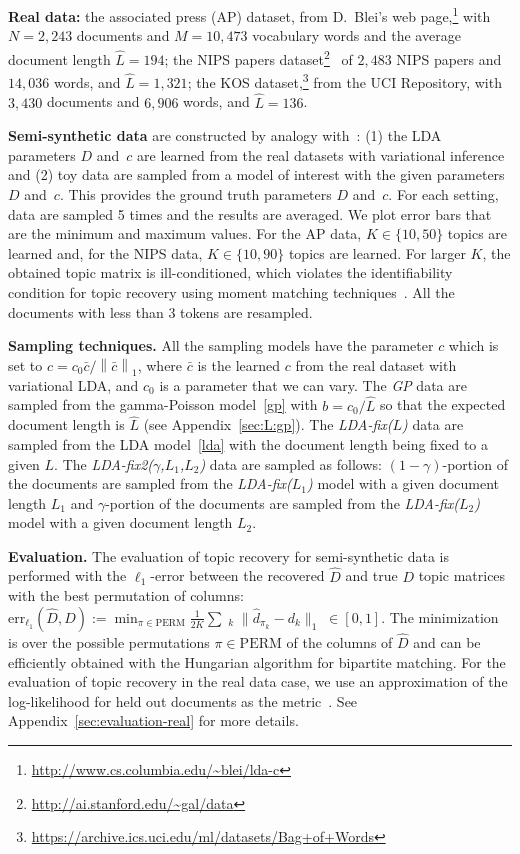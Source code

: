 \documentclass{article}
\newcommand{\emp}[1]{\textbf{#1}}
\newcommand{\norm}[1]{\left\|#1\right\|}
\newcommand{\wh}[1]{\widehat{#1}}
\begin{document}
\emp{Real data:} the associated press (AP) dataset, from D.~Blei's web page,\footnote{\url{http://www.cs.columbia.edu/~blei/lda-c}} with $N = 2,243$ documents and $M = 10,473$ vocabulary words and the average document length $\wh{L}=194$; the NIPS papers dataset\footnote{\url{http://ai.stanford.edu/~gal/data}}~\cite{nips_data} of $2,483$ NIPS papers and $14,036$ words, and $\wh{L}=1,321$; the KOS dataset,\footnote{\url{https://archive.ics.uci.edu/ml/datasets/Bag+of+Words}} from the UCI Repository, with $3,430$ documents and $6,906$ words, and $\wh{L} = 136$. 


\emp{Semi-synthetic data} are constructed 
by analogy with~\cite{AroEtAl2013}: (1) the LDA parameters $D$ and~$c$ are learned from the real datasets with variational inference and (2) toy data are sampled from a model of interest with the given parameters $D$ and~$c$. This provides the ground truth parameters $D$ and~$c$. For each setting, data are sampled 5 times and the results are averaged. We plot error bars that are the minimum and maximum values. For the AP data, $K\in\{10,50\}$ topics are learned and, for the NIPS data, $K\in\{10,90\}$ topics are learned. 
For larger $K$, the obtained topic matrix is ill-conditioned, which violates the identifiability condition for topic recovery using moment matching techniques~\cite{AnaEtAl2012}. All the documents with less than $3$ tokens are resampled.


\emp{Sampling techniques.} All the sampling models have the parameter $c$ which is set to $c = c_0 \bar{c}/\norm{\bar{c}}_1$, where $\bar{c}$ is the learned $c$ from the real dataset with 
variational LDA, and $c_0$ is a parameter that we can vary.
The {\textit{GP}} data are sampled from the gamma-Poisson model~\eqref{gp} with $b=c_0/\wh{L}$ so that the expected document length is $\wh{L}$ (see Appendix~\ref{sec:L:gp}).
The {\textit{LDA-fix($L$)}} data are sampled from the LDA model~\eqref{lda} with the document length being fixed to a given $L$. The {\textit{LDA-fix2($\gamma$,$L_1$,$L_2$)}} data are sampled as follows: 
 $(1-\gamma)$-portion  of the documents are sampled from the \textit{LDA-fix($L_1$)} model with a given document length $L_1$ and $\gamma$-portion of the documents are sampled from the \textit{LDA-fix($L_2$)} model with a given document length $L_2$.


\emp{Evaluation.} The evaluation of topic recovery for semi-synthetic data is performed with the $\ell_1$-error between the recovered $\wh{D}$ and true $D$ topic matrices with the best permutation of columns:
$\text{err}_{\ell_1} (\wh{D},D) := \min_{\pi \in \mathrm{PERM}} \frac{1}{2K} \sum\mathop{}_{k} \| \wh{d}_{\pi_k} - d_{k}\|_1 \;\in [0,1]$.
The minimization is over the possible permutations $\pi \in \mathrm{PERM}$ of the columns of 
$\wh{D}$ and can be efficiently obtained with the Hungarian algorithm for bipartite matching.
For the evaluation of topic recovery in the real data case, we use an approximation of the log-likelihood for held out documents as the metric~\cite{WalEtAl2009}.
See Appendix~\ref{sec:evaluation-real} for more details.
\end{document}
